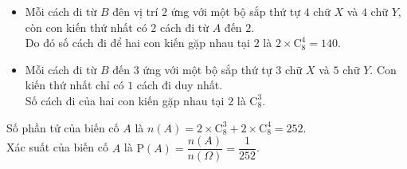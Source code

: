 \begin{bt}
{\begin{itemize}
			Số cách đi của hai con kiến gặp nhau tại $1$ là $\mathrm{C}_8^3$.
			\item Mỗi cách đi từ $B$ đên vị trí $2$ ứng với một bộ sắp thứ tự $4$ chữ $X$ và $4$ chữ $Y$, còn con kiến thứ nhất có $2$ cách đi từ $A$ đến $2$.\\
			Do đó số cách đi để hai con kiến gặp nhau tại $2$ là $2\times\mathrm{C}_8^4=140$.
			\item Mỗi cách đi từ $B$ đến $3$ ứng với một bộ sắp thứ tự $3$ chữ $X$ và $5$ chữ $Y$. Con kiến thứ nhất chỉ có $1$ cách đi duy nhất.\\
			Số cách đi của hai con kiến gặp nhau tại $2$ là $\mathrm{C}_8^3$.
		\end{itemize}
		Số phần tử của biến cố $A$ là $n(A)=2\times\mathrm{C}_8^3+2\times \mathrm{C}_8^4=252$.\\
		Xác suất của biến cố $A$ là $\mathrm{P}(A)=\dfrac{n(A)}{n(\Omega)}=\dfrac{1}{252}$.
	}
\end{bt}


